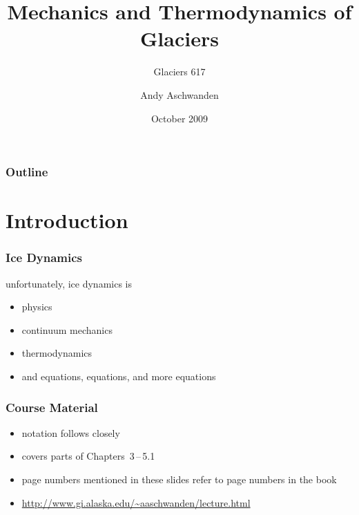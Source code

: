 \documentclass[hide notes,intlimits]{beamer}
\title[Glacier Dynamics] %
{Mechanics and Thermodynamics of Glaciers}
\subtitle{Glaciers 617}
\author[Aschwanden] %
{Andy Aschwanden}
\institute[ARSC] %
{
  Arctic Region Supercomputing Center\\
  University of Alaska Fairbanks, USA
}
\date{October 2009}
\begin{document}
\begin{frame}
  \titlepage
\end{frame}

\begin{frame}
 \frametitle{Outline}
 \tableofcontents[subsectionstyle=hide]
\end{frame}

\section{Introduction}



\begin{frame}[plain] %
  \begin{figure}
  \end{figure}
\end{frame}

\begin{frame}
  \frametitle{Ice Dynamics}
  unfortunately, \alert{ice dynamics} is
  \begin{itemize}
    \item physics
    \item continuum mechanics
    \item thermodynamics
    \item and equations, equations, and more equations
  \end{itemize}
\end{frame}

\begin{frame}
  \frametitle{Course Material}
  \begin{itemize}
    \item notation follows closely \cite{GreveBlatter_disg}
    \item covers parts of Chapters~3\,--\,5.1
    \item page numbers mentioned in these slides refer to page numbers in the book
    \item \url{http://www.gi.alaska.edu/~aaschwanden/lecture.html}
  \end{itemize}
  \def\newblock{}
  
\end{frame}
\end{document}

